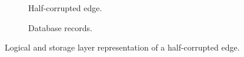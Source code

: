 \begin{figure}[htp]
  \centering
  \begin{subfigure}{\linewidth}
    \centering
    
    \caption{Half-corrupted edge.}
    \label{hc-edge}
  \end{subfigure}
  \begin{subfigure}{\linewidth}
    \vspace{2ex}
    \centering
    
    \caption{Database records.}
    \label{hc-db-rep}
  \end{subfigure}%
  \caption{Logical and storage layer representation of a half-corrupted edge.}
  \label{hc}
\end{figure}